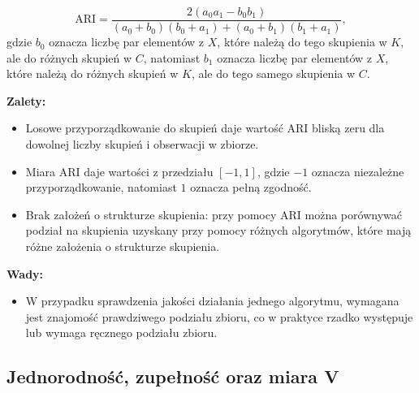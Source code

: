 \documentclass{praca1}
\begin{document}
\begin{equation}
\textrm{ARI} = \frac{2 (a_0 a_1 - b_0 b_1) }{(a_0 + b_0)(b_0 + a_1) + (a_0 + b_1)(b_1 + a_1)},
\end{equation}
gdzie $b_0$ oznacza liczbę par elementów z $X$, które należą do tego skupienia w $K$, ale do różnych skupień w $C$, natomiast $b_1$ oznacza liczbę par elementów z $X$, które należą do różnych skupień w $K$, ale do tego samego skupienia w $C$.






\textbf{Zalety:}
\begin{itemize}
\item Losowe przyporządkowanie do skupień daje wartość $\textrm{ARI}$ bliską zeru dla dowolnej liczby skupień i obserwacji w zbiorze.
\item Miara $\textrm{ARI}$ daje wartości z przedziału $[-1, 1]$, gdzie $-1$ oznacza niezależne przyporządkowanie, natomiast $1$ oznacza pełną zgodność.
\item Brak założeń o strukturze skupienia: przy pomocy $\textrm{ARI}$ można porównywać podział na skupienia uzyskany przy pomocy różnych algorytmów, które mają różne założenia o strukturze skupienia.
\end{itemize}

\textbf{Wady:}
\begin{itemize}
\item W przypadku sprawdzenia jakości działania jednego algorytmu, wymagana jest znajomość prawdziwego podziału zbioru, co w praktyce rzadko występuje lub wymaga ręcznego podziału zbioru.
\end{itemize}

\subsection{Jednorodność, zupełność oraz miara V}
\end{document}
